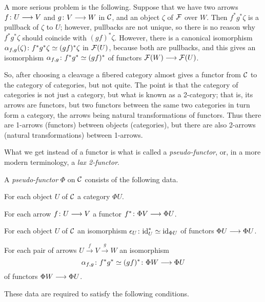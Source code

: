 \begin{3   FIBERED CATEGORIES}
\begin{3.1 Fibered categories}
A more serious problem is the following. Suppose that we have two arrows $f \colon U \arr V$ and $g \colon V \arr W$ in $\mathcal{C}$, and an object $\zeta$ of $\mathcal{F}$ over $W$. Then $f^*g^*\zeta$ is a pullback of $\zeta$ to $U$; however, pullbacks are not unique, so there is no reason why $f^*g^*\zeta$ should coincide with $(gf)^*\zeta$. However, there is a canonical isomorphism $\alpha_{f,g}(\zeta) \colon f^*g^*\zeta \simeq (gf)^*\zeta$ in $\mathcal{F}(U)$, because both are pullbacks, and this gives an isomorphism $\alpha_{f,g} \colon f^*g^* \simeq (gf)^*$ of functors $\cF(W) \arr \cF(U)$.

So, after choosing a cleavage a fibered category almost gives a functor from $\mathcal{C}$ to the category of categories, but not quite. The point is that the category of categories is not just a category, but what is known as a 2-category; that is, its arrows are functors, but two functors between the  same two categories in turn form a category, the arrows being natural transformations of functors. Thus there are 1-arrows (functors) between objects (categories), but there are also 2-arrows (natural transformations) between 1-arrows.

What we get instead of a functor is what is called a \emph{pseudo-functor}, or, in a more modern terminology, a \emph{lax 2-functor}.

\begin{definition}\label{def:pseudo-functor}
A \emph{pseudo-functor} $\Phi$ on $\mathcal{C}$ consists of the following data.

\begin{enumeratei}

\item For each object $U$ of $\mathcal{C}$ a category $\Phi U$.

\item For each arrow $f \colon U \arr V$ a functor $f^* \colon \Phi V \arr \Phi U$.

\item For each object $U$ of $\mathcal{C}$ an isomorphism $\epsilon_U\colon \mathrm{id}_U^* \simeq \mathrm{id}_{\Phi U}$ of functors $\Phi U \arr \Phi U$.

\item For each pair of arrows $U \xrightarrow{f} V \xrightarrow{g} W$ an isomorphism
   \[
   \isoass_{f,g} \colon f^*g^* \simeq (gf)^* \colon \Phi W \arr \Phi U
   \]
of functors $\Phi W \arr \Phi U$.

\end{enumeratei}

These data are required to satisfy the following conditions.


\end{definition}
\end{3.1 Fibered categories}
\end{3   FIBERED CATEGORIES}
